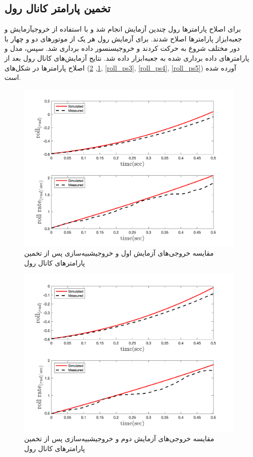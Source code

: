 \subsection{تخمین پارامتر کانال رول}
برای اصلاح پارامترها رول چندین آزمایش انجام شد و با استفاده از خروجیآزمایش و جعبه‌ابزاز
پارامترها اصلاح شدند.
برای آزمایش رول هر یک از موتورهای دو و چهار  با دور مختلف شروع به حرکت کردند و خروجیسنسور داده برداری شد. سپس، مدل و پارامترهای داده برداری شده به جعبه‌ابزار
داده شد. نتایج آزمایش‌های کانال رول بعد از اصلاح پارامترها در شکل‌های
(\ref{roll_ps1}, \ref{roll_ps2}, \ref{roll_ps3}, \ref{roll_ps4}, \ref{roll_ps5})
آورده شده است.

\begin{figure}[H]
	\includegraphics[width=12cm]{../../Figures/RCP/roll_parameter_estimation/RCP_roll_S1.png}
	\centering
	\caption{مقايسه خروجی‌های آزمايش اول و خروجیشبیه‌سازی پس از تخمین پارامترهای کانال رول}
	\label{roll_ps1}
\end{figure}
\begin{figure}[H]
	\includegraphics[width=12cm]{../../Figures/RCP/roll_parameter_estimation/RCP_roll_S2.png}
	\centering
	\caption{مقايسه خروجی‌های آزمايش دوم و خروجیشبیه‌سازی پس از تخمین پارامترهای کانال رول}
	\label{roll_ps2}
\end{figure}
